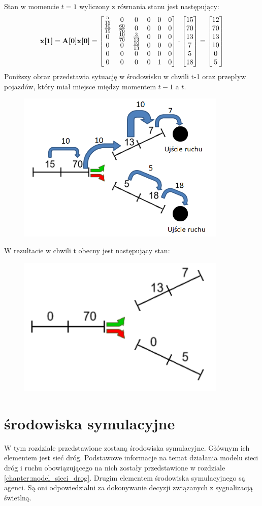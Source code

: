 \documentclass[12pt]{book}
\theoremstyle{plain}
\begin{document}
Stan w momencie $t=1$ wyliczony z równania stanu jest następujący:
\[\textbf{x[1]}=\textbf{A[0]x[0]}=\begin{bmatrix} \frac{5}{15} & 0 & 0 & 0 & 0 & 0 \\ \frac{10}{15} & \frac{60}{70} & 0 & 0 & 0 & 0 \\ 0 & \frac{10}{70} & \frac{3}{13} & 0 & 0 & 0 \\ 0 & 0 & \frac{10}{13} & 0 & 0 & 0 \\ 0 & 0 & 0 & 0 & 0 & 0 \\ 0 & 0 & 0 & 0 & 1 & 0 \end{bmatrix} \cdot \begin{bmatrix} 15 \\ 70 \\ 13 \\ 7 \\ 5 \\ 18 \end{bmatrix} = \begin{bmatrix} 12 \\ 70 \\ 13 \\ 10 \\ 0 \\ 5 \end{bmatrix} \]
Poniższy obraz przedstawia sytuację w środowisku w chwili t-1 oraz przepływ pojazdów, który miał miejsce między momentem $t-1$ a $t$.
\begin{figure}[H]
	\centering
	\includegraphics[width=10cm]{images/env_11_przeplyw_korek}
	\label{fig:env_11_case_0_przeplyw}
\end{figure}\noindent
W rezultacie w chwili t obecny jest następujący stan:
\begin{figure}[H]
	\centering
	\includegraphics[width=10cm]{images/env_11_po_korku}
	\label{fig:env_11_case_0_po_przeplywie}
\end{figure}\noindent


\chapter {środowiska symulacyjne}
W tym rozdziale przedstawione zostaną środowiska symulacyjne. Głównym ich elementem jest sieć dróg. Podstawowe informacje na temat działania modelu sieci dróg i ruchu obowiązującego na nich zostały przedstawione w rozdziale \ref{chapter:model_sieci_drog}. Drugim elementem środowiska symulacyjnego są agenci. Są oni odpowiedzialni za dokonywanie decyzji związanych z sygnalizacją świetlną. 
\end{document}

